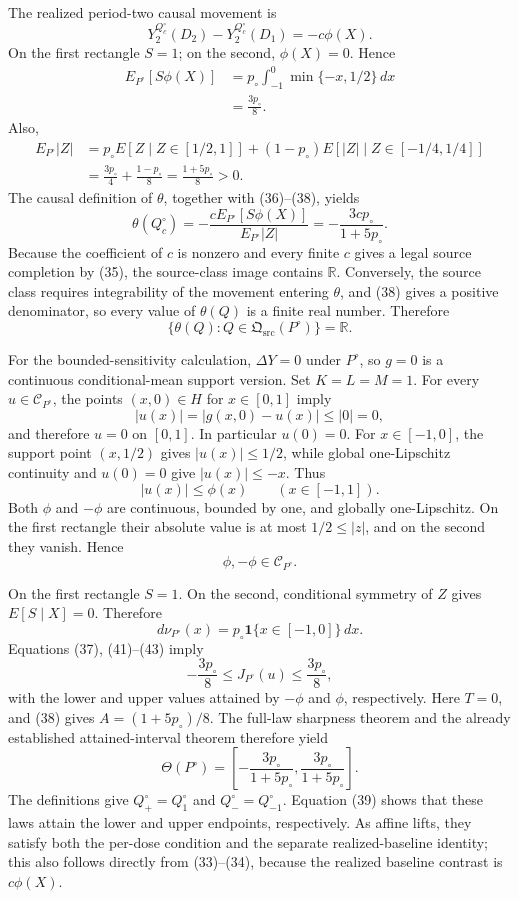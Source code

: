 The realized period-two causal movement is
\[
Y_2^{Q_c^{\circ}}(D_2)-Y_2^{Q_c^{\circ}}(D_1)=-c\phi(X). \tag{36}
\]
On the first rectangle \(S=1\); on the second, \(\phi(X)=0\). Hence
\[
\begin{aligned}
E_{P^{\circ}}[S\phi(X)]
&=p_{\circ}\int_{-1}^{0}\min\{-x,1/2\}\,dx\\
&=\frac{3p_{\circ}}8.
\end{aligned} \tag{37}
\]
Also,
\[
\begin{aligned}
E_{P^{\circ}}|Z|
&=p_{\circ}E[Z\mid Z\in[1/2,1]]
 +(1-p_{\circ})E[|Z|\mid Z\in[-1/4,1/4]]\\
&=\frac{3p_{\circ}}4+\frac{1-p_{\circ}}8
=\frac{1+5p_{\circ}}8>0.
\end{aligned} \tag{38}
\]
The causal definition of \(\theta\), together with (36)--(38), yields
\[
\theta(Q_c^{\circ})
=-\frac{cE_{P^{\circ}}[S\phi(X)]}{E_{P^{\circ}}|Z|}
=-\frac{3cp_{\circ}}{1+5p_{\circ}}. \tag{39}
\]
Because the coefficient of \(c\) is nonzero and every finite \(c\) gives a legal source completion by (35), the source-class image contains \(\mathbb R\). Conversely, the source class requires integrability of the movement entering \(\theta\), and (38) gives a positive denominator, so every value of \(\theta(Q)\) is a finite real number. Therefore
\[
\{\theta(Q):Q\in\mathfrak Q_{\mathrm{src}}(P^{\circ})\}=\mathbb R. \tag{40}
\]

For the bounded-sensitivity calculation, \(\Delta Y=0\) under \(P^{\circ}\), so \(g=0\) is a continuous conditional-mean support version. Set \(K=L=M=1\). For every \(u\in\mathcal C_{P^{\circ}}\), the points \((x,0)\in H\) for \(x\in[0,1]\) imply
\[
|u(x)|=|g(x,0)-u(x)|\leq |0|=0,
\]
and therefore \(u=0\) on \([0,1]\). In particular \(u(0)=0\). For \(x\in[-1,0]\), the support point \((x,1/2)\) gives \(|u(x)|\leq1/2\), while global one-Lipschitz continuity and \(u(0)=0\) give \(|u(x)|\leq -x\). Thus
\[
|u(x)|\leq\phi(x)
\qquad(x\in[-1,1]). \tag{41}
\]
Both \(\phi\) and \(-\phi\) are continuous, bounded by one, and globally one-Lipschitz. On the first rectangle their absolute value is at most \(1/2\leq|z|\), and on the second they vanish. Hence
\[
\phi,-\phi\in\mathcal C_{P^{\circ}}. \tag{42}
\]

On the first rectangle \(S=1\). On the second, conditional symmetry of \(Z\) gives \(E[S\mid X]=0\). Therefore
\[
d\nu_{P^{\circ}}(x)=p_{\circ}\mathbf 1\{x\in[-1,0]\}\,dx. \tag{43}
\]
Equations (37), (41)--(43) imply
\[
-\frac{3p_{\circ}}8
\leq J_{P^{\circ}}(u)
\leq\frac{3p_{\circ}}8, \tag{44}
\]
with the lower and upper values attained by \(-\phi\) and \(\phi\), respectively. Here \(T=0\), and (38) gives \(A=(1+5p_{\circ})/8\). The full-law sharpness theorem and the already established attained-interval theorem therefore yield
\[
\Theta(P^{\circ})=
\left[-\frac{3p_{\circ}}{1+5p_{\circ}},
       \frac{3p_{\circ}}{1+5p_{\circ}}\right]. \tag{45}
\]
The definitions give \(Q_+^{\circ}=Q_1^{\circ}\) and \(Q_-^{\circ}=Q_{-1}^{\circ}\). Equation (39) shows that these laws attain the lower and upper endpoints, respectively. As affine lifts, they satisfy both the per-dose condition and the separate realized-baseline identity; this also follows directly from (33)--(34), because the realized baseline contrast is \(c\phi(X)\).

